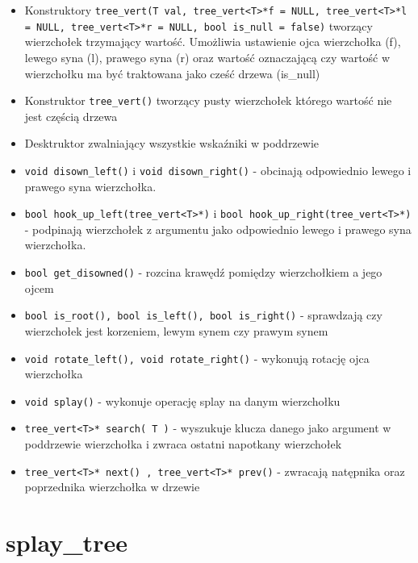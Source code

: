 \documentclass[declaration,shortabstract]{iithesis}
\theoremstyle{thm}
\theoremstyle{remark}
\theoremstyle{plain}
\theoremstyle{plain}
\theoremstyle{plain}
\begin{document}
\begin{itemize}

\item{Konstruktory \texttt{tree\_vert(T val, tree\_vert<T>*f = NULL, tree\_vert<T>*l = NULL, tree\_vert<T>*r = NULL, bool is\_null = false)} tworzący wierzchołek trzymający wartość. Umożliwia ustawienie ojca wierzchołka (f), lewego syna (l), prawego syna (r) oraz wartość oznaczającą czy wartość w wierzchołku ma być traktowana jako cześć drzewa (is\_null)}
\item{Konstruktor \texttt{tree\_vert()} tworzący pusty wierzchołek którego wartość nie jest częścią drzewa}

\item{Desktruktor zwalniający wszystkie wskaźniki w poddrzewie}

\item{\texttt{void disown\_left()} i \texttt{void disown\_right()} - obcinają odpowiednio lewego i prawego syna wierzchołka.}
    
\item{\texttt{bool hook\_up\_left(tree\_vert<T>*)} i \texttt{bool hook\_up\_right(tree\_vert<T>*)} - podpinają wierzchołek z argumentu jako odpowiednio lewego i prawego syna wierzchołka.}

\item{\texttt{bool get\_disowned()} - rozcina krawędź pomiędzy wierzchołkiem a jego ojcem}

\item{\texttt{bool is\_root(), bool is\_left(),  bool is\_right()} - sprawdzają czy wierzchołek jest korzeniem, lewym synem czy prawym synem}

\item{\texttt{void rotate\_left(), void rotate\_right()} - wykonują rotację ojca wierzchołka}
    
\item{\texttt{void splay()} - wykonuje operację splay na danym wierzchołku}
    
\item{\texttt{tree\_vert<T>* search( T )} - wyszukuje klucza danego jako argument w poddrzewie wierzchołka i zwraca ostatni napotkany wierzchołek}
   
\item{\texttt{tree\_vert<T>* next() ,  tree\_vert<T>* prev()} - zwracają natępnika oraz poprzednika wierzchołka w drzewie}
\end{itemize}

\section{splay\_tree}
\end{document}
